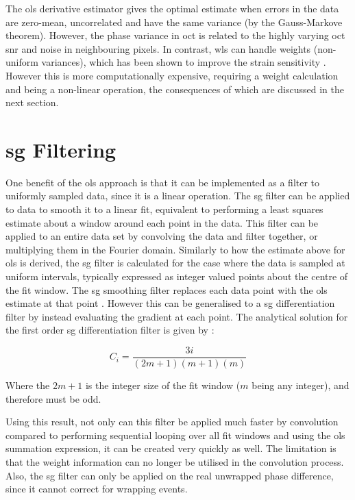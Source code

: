 The \ac{ols} derivative estimator gives the optimal estimate when errors in the data are zero-mean, uncorrelated and have the same variance (by the Gauss-Markove theorem). However, the phase variance in \ac{oct} is related to the highly varying \ac{oct} \ac{snr} and noise in neighbouring pixels. In contrast, \ac{wls} can handle weights (non-uniform variances), which has been shown to improve the strain sensitivity \cite{kennedy_strain_2012}. However this is more computationally expensive, requiring a weight calculation and being a non-linear operation, the consequences of which are discussed in the next section.

\section{\ac{sg} Filtering}\label{sg_filter}
One benefit of the \ac{ols} approach is that it can be implemented as a filter to uniformly sampled data, since it is a linear operation. The \ac{sg} filter \cite{savitzky_smoothing_1964} can be applied to data to smooth it to a linear fit, equivalent to performing a least squares estimate about a window around each point in the data. 
This filter can be applied to an entire data set by convolving the data and filter together, or multiplying them in the Fourier domain. 
Similarly to how the estimate above for \ac{ols} is derived, the \ac{sg} filter is calculated for the case where the data is sampled at uniform intervals, typically expressed as integer valued points about the centre of the fit window. The \ac{sg} smoothing filter replaces each data point with the \ac{ols} estimate at that point \cite{savitzky_smoothing_1964}. However this can be generalised to a \ac{sg} differentiation filter by instead evaluating the gradient at each point. 
The analytical solution for the first order \ac{sg} differentiation filter is given by \cite{madden_comments_1978}:

\begin{equation}
	\label{sg_coeff}
	C_i = \frac{3 i}{(2m+1)(m+1)(m)}
\end{equation}

Where the $2m+1$ is the integer size of the fit window ($m$ being any integer), and therefore must be odd. 

Using this result, not only can this filter be applied much faster by convolution compared to performing sequential looping over all fit windows and using the \ac{ols} summation expression, it can be created very quickly as well. The limitation is that the weight information can no longer be utilised in the convolution process. Also, the \ac{sg} filter can only be applied on the real unwrapped phase difference, since it cannot correct for wrapping events. 

